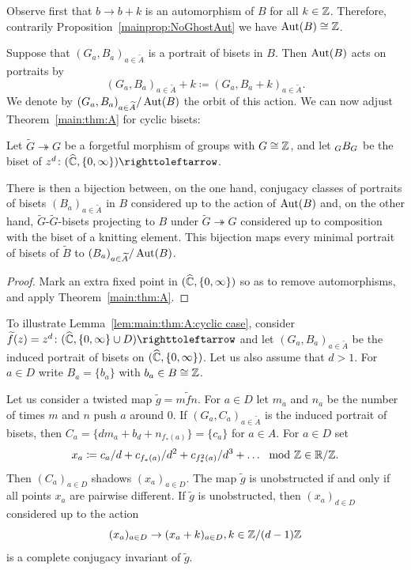 \documentclass{amsart}
\newcommand\wtf{{\widetilde f}}
\newcommand\wtg{{\widetilde g}}
\newcommand\wtA{{\widetilde A}}
\newcommand\wtB{{\widetilde B}}
\newcommand\wtG{{\widetilde G}}
\begin{document}
Observe first that $b\to b+k$ is an automorphism of $B$ for all
$k\in {\mathbb Z}$. Therefore, contrarily Proposition~\ref{mainprop:NoGhostAut}
we have $\operatorname{Aut}(B)\cong{\mathbb Z}$.

Suppose that $(G_a,B_a)_{a\in\wtA}$ is a portrait of bisets in
$B$. Then $\operatorname{Aut}(B)$ acts on portraits by
\[(G_a,B_a)_{a\in\wtA} +k \coloneqq
  (G_a,B_a+k)_{a\in\wtA}.
\]
We denote by $(G_a,B_a)_{a\in\wtA}/\Aut(B)$ the orbit of this
action.  We can now adjust Theorem~\ref{main:thm:A} for cyclic bisets:
\begin{lem}\label{lem:main:thm:A:cyclic case}
  Let $\wtG\twoheadrightarrow G$ be a forgetful morphism of
  groups with $G\cong{\mathbb Z}$, and let $\subscript G B_G$ be the biset of
  $z^d\colon(\widehat\C,\{0,\infty\})\selfmap$.

  There is then a bijection between, on the one hand, conjugacy
  classes of portraits of bisets $(B_a)_{a\in\wtA}$ in $B$
  considered up to the action of $\operatorname{Aut}(B)$ and, on the other hand,
  $\wtG$-$\wtG$-bisets projecting to $B$ under
  $\wtG\twoheadrightarrow G$ considered up to composition with
  the biset of a knitting element. This bijection maps every minimal
  portrait of bisets of $\wtB$ to
  $(B_a)_{a\in\wtA}/\Aut(B)$.
\end{lem}
\begin{proof}
  Mark an extra fixed point in $(\widehat{{\mathbb C}},\{0,\infty\})$ so as to
  remove automorphisms, and apply Theorem~\ref{main:thm:A}.
\end{proof}

To illustrate Lemma~\ref{lem:main:thm:A:cyclic case}, consider
$\wtf(z)=z^d\colon (\widehat\C,\{0,\infty\}\cup D)\selfmap$
and let $(G_a,B_a)_{a\in \wtA}$ be the induced portrait of
bisets on $(\widehat{{\mathbb C}},\{0,\infty\})$. Let us also assume that
$d>1$. For $a\in D$ write $B_a=\{b_a\}$ with $b_a\in B\cong {\mathbb Z}$.

Let us consider a twisted map $\wtg=m\wtf n$. For
$a\in D$ let $m_a$ and $n_a$ be the number of times $m$ and $n$ push
$a$ around $0$. If $(G_a,C_a)_{a\in \wtA}$ is the induced
portrait of bisets, then $C_a=\{d m_a+b_d+n_{f_*(a)}\}=\{c_a\}$ for
$a\in A$. For $a\in D$ set
\[x_a\coloneq c_a/d+c_{f_*(a)}/d^2+ c_{f_*^2(a)}/d^3+\dots \mod {{\mathbb Z}}\in
  {\mathbb R}/{\mathbb Z}.\] Then $(C_a)_{a\in D}$ shadows $(x_a)_{a\in D}$. The map
$\wtg$ is unobstructed if and only if all points $x_a$ are
pairwise different. If $\wtg$ is unobstructed, then
$(x_a)_{d\in D}$ considered up to the action
\[(x_a)_{a\in D} \to (x_a+k)_{a\in D},k\in{\mathbb Z}/(d-1){\mathbb Z}\]
is a complete conjugacy invariant of $\wtg$.

\begin{bibdiv}
\begin{biblist}
\end{biblist}
\end{bibdiv}
\end{document}
